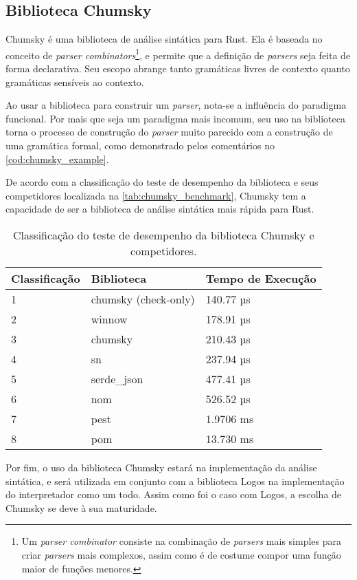 \subsection{Biblioteca Chumsky}

Chumsky é uma biblioteca de análise sintática para Rust. Ela é baseada no conceito de \textit{parser combinators}\footnote{Um \textit{parser combinator} consiste na combinação de \textit{parsers} mais simples para criar \textit{parsers} mais complexos, assim como é de costume compor uma função maior de funções menores.}, e permite que a definição de \textit{parsers} seja feita de forma declarativa. Seu escopo abrange tanto gramáticas livres de contexto quanto gramáticas sensíveis ao contexto.

Ao usar a biblioteca para construir um \textit{parser}, nota-se a influência do paradigma funcional. Por mais que seja um paradigma mais incomum, seu uso na biblioteca torna o processo de construção do \textit{parser} muito parecido com a construção de uma gramática formal, como demonstrado pelos comentários no \autoref{cod:chumsky_example}.

\codigoRust

\vspace{-1em}

De acordo com a classificação do teste de desempenho da biblioteca e seus competidores localizada na \autoref{tab:chumsky_benchmark}, Chumsky tem a capacidade de ser a biblioteca de análise sintática mais rápida para Rust.

\FloatBarrier

\begin{table}[H]
	\centering
	\caption{Classificação do teste de desempenho da biblioteca Chumsky e competidores.}
	{
		\begin{tabular}{lll}
			\hline
			\textbf{Classificação} & \textbf{Biblioteca}  & \textbf{Tempo de Execução} \\ \hline
			1                      & chumsky (check-only) & 140.77 µs                  \\
			2                      & winnow               & 178.91 µs                  \\
			3                      & chumsky              & 210.43 µs                  \\
			4                      & sn                   & 237.94 µs                  \\
			5                      & serde\_json          & 477.41 µs                  \\
			6                      & nom                  & 526.52 µs                  \\
			7                      & pest                 & 1.9706 ms                  \\
			8                      & pom                  & 13.730 ms                  \\ \hline
		\end{tabular}
	}
	\label{tab:chumsky_benchmark}
\end{table}

Por fim, o uso da biblioteca Chumsky estará na implementação da análise sintática, e será utilizada em conjunto com a biblioteca Logos na implementação do interpretador como um todo. Assim como foi o caso com Logos, a escolha de Chumsky se deve à sua maturidade.
